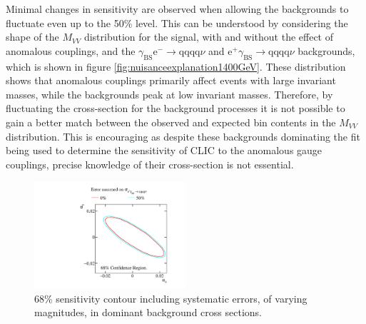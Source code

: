 Minimal changes in sensitivity are observed when allowing the backgrounds to fluctuate even up to the 50\% level.  This can be understood by considering the shape of the $M_{VV}$ distribution for the signal, with and without the effect of anomalous couplings, and the $\gamma_{\text{BS}}\text{e}^{-} \rightarrow \text{qqqq}\nu$ and $\text{e}^{+}\gamma_{\text{BS}} \rightarrow \text{qqqq}\nu$ backgrounds, which is shown in figure \ref{fig:nuisanceexplanation1400GeV}.  These distribution shows that anomalous couplings primarily affect events with large invariant masses, while the backgrounds peak at low invariant masses.  Therefore, by fluctuating the cross-section for the background processes it is not possible to gain a better match between the observed and expected bin contents in the $M_{VV}$ distribution.  This is encouraging as despite these backgrounds dominating the fit being used to determine the sensitivity of CLIC to the anomalous gauge couplings, precise knowledge of their cross-section is not essential.

\begin{figure}[h!]
\centering
\includegraphics[width=0.5\textwidth]{PhysicsAnalysis/Plots/NuisanceFit/1400GeV/Nuisance.pdf}
\caption[68\% sensitivity contour including systematic errors, of varying magnitudes, in dominant background cross sections.]{68\% sensitivity contour including systematic errors, of varying magnitudes, in dominant background cross sections.}
\label{fig:nuisance1400GeV}
\end{figure}

